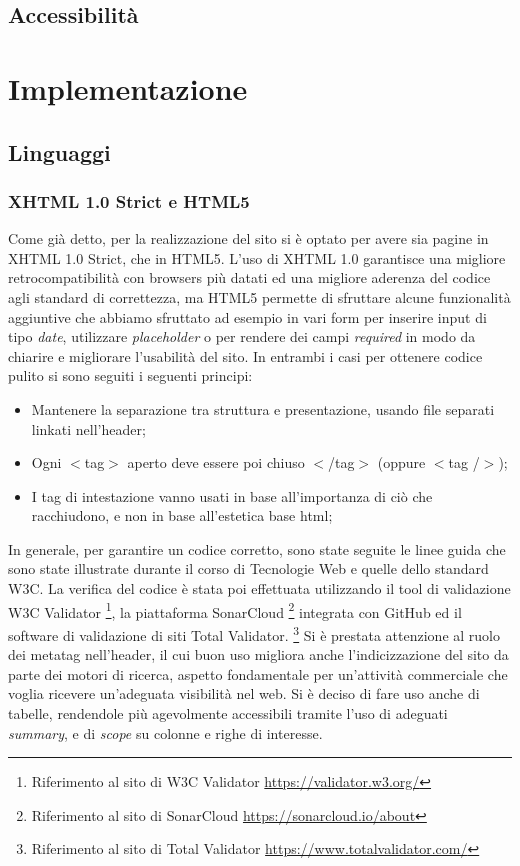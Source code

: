 \documentclass{article}
\begin{document}
		\subsection{Accessibilità}
	\section{Implementazione}
		\subsection{Linguaggi}
			\subsubsection{XHTML 1.0 Strict e HTML5}
			    Come già detto, per la realizzazione del sito si è optato per avere sia pagine in XHTML 1.0 Strict, che in HTML5. L'uso di XHTML 1.0 garantisce una migliore retrocompatibilità con browsers più datati ed una migliore aderenza del codice agli standard di correttezza, ma HTML5 permette di sfruttare alcune funzionalità aggiuntive che abbiamo sfruttato ad esempio in vari form per inserire input di tipo \textit{date}, utilizzare \textit{placeholder} o per rendere dei campi \textit{required} in modo da chiarire e migliorare l'usabilità del sito. In entrambi i casi per ottenere codice pulito si sono seguiti i seguenti principi:
			    \begin{itemize}
			        \item Mantenere la separazione tra struttura e presentazione, usando file separati linkati nell'header;
			        \item Ogni $<$tag$>$ aperto deve essere poi chiuso $<$/tag$>$ (oppure $<$tag /$>$);
			        \item I tag di intestazione vanno usati in base all'importanza di ciò che racchiudono, e non in base all'estetica base html;
			    \end{itemize}
			    \newline In generale, per garantire un codice corretto, sono state seguite le linee guida che sono state illustrate durante il corso di Tecnologie Web e quelle dello standard W3C. La verifica del codice è stata poi effettuata  utilizzando il tool di validazione W3C Validator%
			    \footnote{Riferimento al sito di W3C Validator \url{https://validator.w3.org/}},
			    la piattaforma SonarCloud%
			    \footnote{Riferimento al sito di SonarCloud \url{https://sonarcloud.io/about}}
			    integrata con GitHub
			    ed il software di validazione di siti Total Validator.%
			    \footnote{Riferimento al sito di Total Validator \url{https://www.totalvalidator.com/}}
			    \newline Si è prestata attenzione al ruolo dei metatag nell'header, il cui buon uso migliora anche l'indicizzazione del sito da parte dei motori di ricerca, aspetto fondamentale per un'attività commerciale che voglia ricevere un'adeguata visibilità nel web.
			    \newline Si è deciso di fare uso anche di tabelle, rendendole più agevolmente accessibili tramite l'uso di adeguati \textit{summary}, e di \textit{scope} su colonne e righe di interesse.
\end{document}

